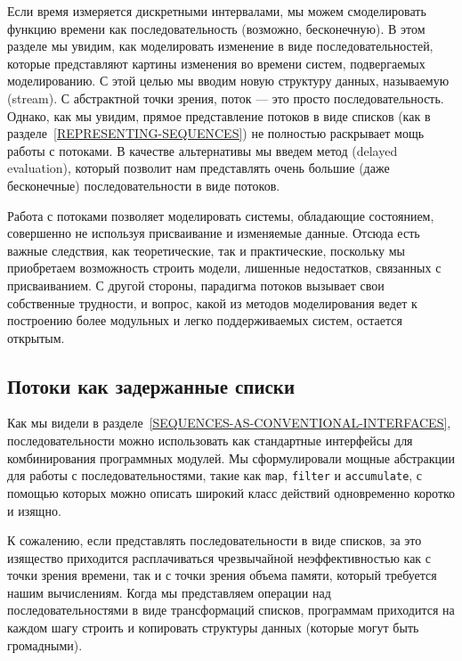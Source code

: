 Если время измеряется дискретными интервалами, мы можем
смоделировать функцию времени как последовательность  (возможно, бесконечную).
В этом разделе мы увидим, как моделировать
изменение в виде последовательностей, которые представляют
картины изменения во времени систем, подвергаемых моделированию.
С этой целью мы вводим новую структуру данных, называемую
 (stream).  С абстрактной точки зрения, поток
--- это просто последовательность.  Однако, как мы увидим, прямое
представление потоков в виде списков (как в
разделе~\ref{REPRESENTING-SEQUENCES}) не полностью раскрывает мощь
работы с потоками.  В качестве альтернативы мы введем метод
 (delayed evaluation),
который позволит нам представлять очень большие (даже бесконечные)
последовательности в виде потоков.

Работа с потоками позволяет моделировать системы,
обладающие состоянием, совершенно не используя присваивание и
изменяемые данные.  Отсюда есть важные следствия, как теоретические,
так и практические, поскольку мы приобретаем возможность строить модели, лишенные
недостатков, связанных с присваиванием.  С другой стороны, парадигма
потоков вызывает свои собственные трудности, и вопрос, какой из
методов моделирования ведет к построению более модульных и
легко поддерживаемых систем, остается открытым.

\subsection{Потоки как задержанные списки}
\label{STREAMS-ARE-DELAYED-LISTS}

Как мы видели в
разделе~\ref{SEQUENCES-AS-CONVENTIONAL-INTERFACES},
последовательности можно использовать как стандартные интерфейсы для
комбинирования программных модулей.  Мы сформулировали мощные
абстракции для работы с последовательностями, такие как
{\tt map}, {\tt filter} и {\tt accumulate}, с
помощью которых можно описать широкий класс действий одновременно коротко и
изящно.

К сожалению, если представлять последовательности в виде
списков, за это изящество приходится расплачиваться чрезвычайной
неэффективностью как с точки зрения времени, так и с точки зрения
объема памяти, который требуется нашим вычислениям.  Когда мы
представляем операции над последовательностями в виде трансформаций
списков, программам приходится на каждом шагу строить и копировать
структуры данных (которые могут быть громадными).

